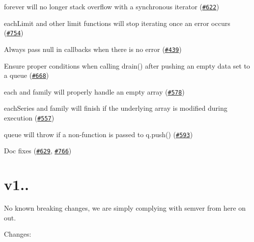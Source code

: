 \begin{DoxyItemize}
\item {\ttfamily forever} will no longer stack overflow with a synchronous iterator (\href{https://github.com/caolan/async/issues/622}{\tt \#622})
\item {\ttfamily each\+Limit} and other limit functions will stop iterating once an error occurs (\href{https://github.com/caolan/async/issues/754}{\tt \#754})
\item Always pass {\ttfamily null} in callbacks when there is no error (\href{https://github.com/caolan/async/issues/439}{\tt \#439})
\item Ensure proper conditions when calling {\ttfamily drain()} after pushing an empty data set to a queue (\href{https://github.com/caolan/async/issues/668}{\tt \#668})
\item {\ttfamily each} and family will properly handle an empty array (\href{https://github.com/caolan/async/issues/578}{\tt \#578})
\item {\ttfamily each\+Series} and family will finish if the underlying array is modified during execution (\href{https://github.com/caolan/async/issues/557}{\tt \#557})
\item {\ttfamily queue} will throw if a non-\/function is passed to {\ttfamily q.\+push()} (\href{https://github.com/caolan/async/issues/593}{\tt \#593})
\item Doc fixes (\href{https://github.com/caolan/async/issues/629}{\tt \#629}, \href{https://github.com/caolan/async/issues/766}{\tt \#766})
\end{DoxyItemize}

\section*{v1..}

No known breaking changes, we are simply complying with semver from here on out.

Changes\+:


